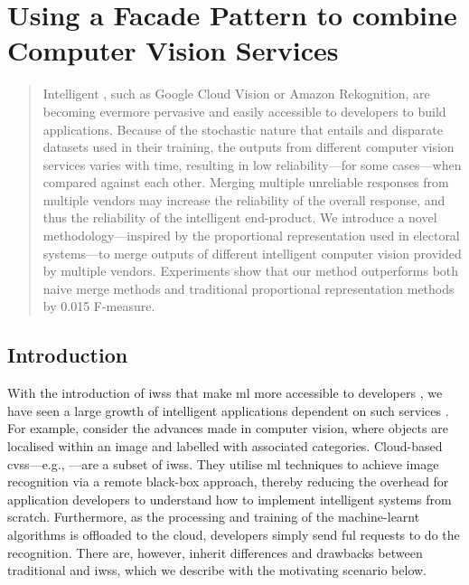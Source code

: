 \chapter[Using a Facade Pattern to combine Computer Vision Services]
{Using a Facade Pattern to combine Computer Vision Services}
\label{ch:icwe2019}
\graphicspath{{mainmatter/publications/figures/icwe2019/}}

\glsresetall
\begin{abstract}
Intelligent , such as Google Cloud Vision or Amazon Rekognition, are becoming evermore pervasive and easily accessible to developers to build applications.
Because of the stochastic nature that  entails and disparate datasets used in their training, the outputs from different computer vision services varies with time, resulting in low reliability---for some cases---when compared against each other.
Merging multiple unreliable  responses from multiple vendors may increase the reliability of the overall response, and thus the reliability of the intelligent end-product.
We introduce a novel methodology---inspired by the proportional representation used in electoral systems---to merge outputs of different intelligent computer vision  provided by multiple vendors.
Experiments show that our method outperforms both naive merge methods and traditional proportional representation methods by 0.015 F-measure.
\end{abstract}
\glsresetall

\section{Introduction}

With the introduction of \glspl{iws} that make \gls{ml} more accessible to developers \citep{Ribeiro:2015dz,Hwang:2017tr}, we have seen a large growth of intelligent applications dependent on such services \citep{Mapillar97:online,FileShad33:online}.
For example, consider the advances made in computer vision, where objects are localised within an image and labelled with associated categories.
Cloud-based \glspl{cvs}---e.g., ---are a subset of \glspl{iws}. They utilise \gls{ml} techniques to achieve image recognition via a remote black-box approach, thereby reducing the overhead for application developers to understand how to implement intelligent systems from scratch. Furthermore, as the processing and training of the machine-learnt algorithms is offloaded to the cloud, developers simply send ful  requests to do the recognition. There are, however, inherit differences and drawbacks between traditional  and \glspl{iws}, which we describe with the motivating scenario below.

